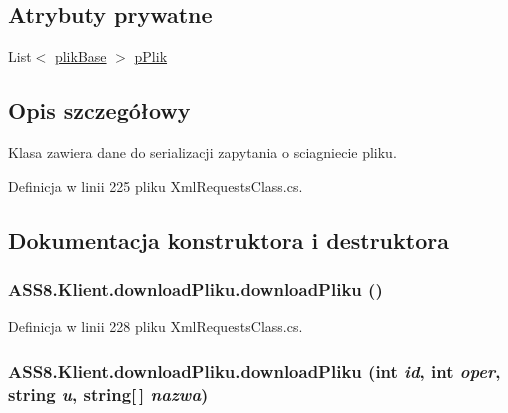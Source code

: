 \subsection*{Atrybuty prywatne}
\begin{CompactItemize}
\item 
List$<$ \hyperlink{a00016}{plikBase} $>$ \hyperlink{a00002_2b7e420409cf7d906d6db326c9c877e6}{pPlik}
\end{CompactItemize}


\subsection{Opis szczegółowy}
Klasa zawiera dane do serializacji zapytania o sciagniecie pliku. 



Definicja w linii 225 pliku XmlRequestsClass.cs.

\subsection{Dokumentacja konstruktora i destruktora}
\hypertarget{a00002_ac619cdb9edb6dd8f1113f6987dbbe35}{
\subsubsection[{downloadPliku}]{\setlength{\rightskip}{0pt plus 5cm}ASS8.Klient.downloadPliku.downloadPliku ()}}
\label{d7/d46/a00002_ac619cdb9edb6dd8f1113f6987dbbe35}




Definicja w linii 228 pliku XmlRequestsClass.cs.\hypertarget{a00002_d4cef9cd224ce0173bf52f3be46e4918}{
\subsubsection[{downloadPliku}]{\setlength{\rightskip}{0pt plus 5cm}ASS8.Klient.downloadPliku.downloadPliku (int {\em id}, \/  int {\em oper}, \/  string {\em u}, \/  string\mbox{[}$\,$\mbox{]} {\em nazwa})}}
\label{d7/d46/a00002_d4cef9cd224ce0173bf52f3be46e4918}




